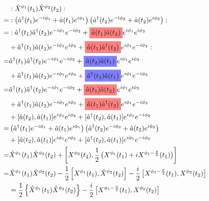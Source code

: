 \documentclass[12pt]{article}
\newcommand{\highlightr}[1]{%
  \colorbox{red!50}{$\displaystyle#1$}}
\newcommand{\highlightb}[1]{%
    \colorbox{blue!50}{$\displaystyle#1$}}
\begin{document}
\begin{align}
&:\hat{X}^{\phi_1}(t_1)\hat{X}^{\phi_2}(t_2):\\
=&:\left(\hat{a}^{\dag}(t_1)e^{-i\phi_1} + \hat{a}(t_1)e^{i \phi_1} \right)\left(\hat{a}^{\dag}(t_2)e^{-i\phi_2} + \hat{a}(t_2)e^{i \phi_2} \right) :\\
=&:\hat{a}^{\dag}(t_1)\hat{a}^{\dag}(t_2)e^{-i\phi_1}e^{-i\phi_2} + \highlightr{\hat{a}(t_1)\hat{a}(t_2)}e^{i\phi_1}e^{i\phi_2}\\
&+ \hat{a}^{\dag}(t_1)\hat{a}(t_2)e^{-i\phi_1}e^{i\phi_2} + \highlightr{\hat{a}(t_1)\hat{a}^{\dag}(t_2)}e^{i\phi_1}e^{-i\phi_2} :\\
=&\hat{a}^{\dag}(t_1)\hat{a}^{\dag}(t_2)e^{-i\phi_1}e^{-i\phi_2} + \highlightb{\hat{a}(t_2)\hat{a}(t_1)}e^{i\phi_1}e^{i\phi_2}\\
&+ \hat{a}^{\dag}(t_1)\hat{a}(t_2)e^{-i\phi_1}e^{i\phi_2} + \highlightb{\hat{a}^{\dag}(t_2)\hat{a}(t_1)}e^{i\phi_1}e^{-i\phi_2} \\
=&\hat{a}^{\dag}(t_1)\hat{a}^{\dag}(t_2)e^{-i\phi_1}e^{-i\phi_2} + \highlightr{\hat{a}(t_1)\hat{a}(t_2)}e^{i\phi_1}e^{i\phi_2}\\
&+ \hat{a}^{\dag}(t_1)\hat{a}(t_2)e^{-i\phi_1}e^{i\phi_2} + \highlightr{\hat{a}(t_1)\hat{a}^{\dag}(t_2)}e^{i\phi_1}e^{-i\phi_2} \\
&+ [\hat{a}(t_2),\hat{a}(t_1)] e^{i\phi_1}e^{i\phi_2} + [\hat{a}^{\dag}(t_2),\hat{a}(t_1)]e^{i\phi_1}e^{-i\phi_2}\\
=& \left(\hat{a}^{\dag}(t_1)e^{-i\phi_1} + \hat{a}(t_1)e^{i \phi_1} \right)\left(\hat{a}^{\dag}(t_2)e^{-i\phi_2} + \hat{a}(t_2)e^{i \phi_2} \right)\\
&+ [\hat{a}(t_2),\hat{a}(t_1)] e^{i\phi_1}e^{i\phi_2} + [\hat{a}^{\dag}(t_2),\hat{a}(t_1)]e^{i\phi_1}e^{-i\phi_2}\\
=& \hat{X}^{\phi_1}(t_1)\hat{X}^{\phi_2}(t_2) + \left[X^{\phi_2}(t_2),\frac{1}{2}\left(X^{\phi_1}(t_1)+iX^{\phi_1-\frac{\pi}{2}}(t_1) \right)\right]\\
=& \hat{X}^{\phi_1}(t_1)\hat{X}^{\phi_2}(t_2) - \frac{1}{2}\left[X^{\phi_1}(t_1),\hat{X}^{\phi_2}(t_2) \right] - \frac{i}{2}\left[X^{\phi_1-\frac{\pi}{2}}(t_1),X^{\phi_2}(t_2)\right]\\
&= \frac{1}{2}\left\{\hat{X}^{\phi_1}(t_1)\hat{X}^{\phi_2}(t_2)\right\} - \frac{i}{2}\left[X^{\phi_1-\frac{\pi}{2}}(t_1),X^{\phi_2}(t_2)\right]
\end{align}
\end{document}
